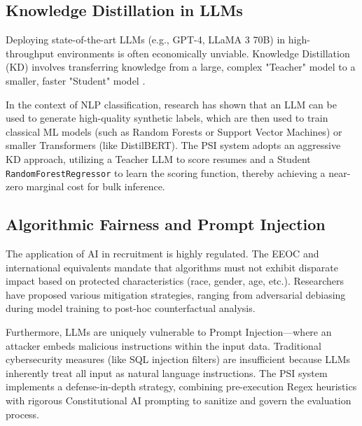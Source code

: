 \subsection{Knowledge Distillation in LLMs}
Deploying state-of-the-art LLMs (e.g., GPT-4, LLaMA 3 70B) in high-throughput environments is often economically unviable. Knowledge Distillation (KD) involves transferring knowledge from a large, complex "Teacher" model to a smaller, faster "Student" model \cite{hinton_distillation}. 

In the context of NLP classification, research has shown that an LLM can be used to generate high-quality synthetic labels, which are then used to train classical ML models (such as Random Forests or Support Vector Machines) or smaller Transformers (like DistilBERT). The PSI system adopts an aggressive KD approach, utilizing a Teacher LLM to score resumes and a Student \texttt{RandomForestRegressor} to learn the scoring function, thereby achieving a near-zero marginal cost for bulk inference.

\subsection{Algorithmic Fairness and Prompt Injection}
The application of AI in recruitment is highly regulated. The EEOC and international equivalents mandate that algorithms must not exhibit disparate impact based on protected characteristics (race, gender, age, etc.). Researchers have proposed various mitigation strategies, ranging from adversarial debiasing during model training to post-hoc counterfactual analysis.

Furthermore, LLMs are uniquely vulnerable to Prompt Injection—where an attacker embeds malicious instructions within the input data. Traditional cybersecurity measures (like SQL injection filters) are insufficient because LLMs inherently treat all input as natural language instructions. The PSI system implements a defense-in-depth strategy, combining pre-execution Regex heuristics with rigorous Constitutional AI prompting to sanitize and govern the evaluation process.
